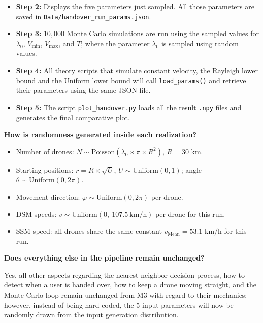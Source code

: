 \documentclass[11pt]{article}
\newcommand{\subquestion}[1]{
    \vspace{0.3cm}
    \noindent\textbf{#1}
    \vspace{0.1cm}
}
\begin{document}
\begin{enumerate}[label=\textbf{Scribe Question \arabic*:}, leftmargin=*, itemsep=1.5em]
\begin{itemize}[leftmargin=*, itemsep=0.3em]
    \item \textbf{Step 2:} Displays the five parameters just sampled. All those parameters are saved
          in \texttt{Data/handover\_run\_params.json}.

    \item \textbf{Step 3:} $10{,}000$ Monte Carlo simulations are run using the sampled values for
          $\lambda_0$, $V_{\min}$, $V_{\max}$, and $T$; where the parameter $\lambda_0$ is sampled
          using random values.

    \item \textbf{Step 4:} All theory scripts that simulate constant velocity, the Rayleigh lower bound
          and the Uniform lower bound will call \texttt{load\_params()} and retrieve their parameters
          using the same JSON file.

    \item \textbf{Step 5:} The script \texttt{plot\_handover.py} loads all the result \texttt{.npy}
          files and generates the final comparative plot.
\end{itemize}

\subquestion{How is randomness generated inside each realization?}

\begin{itemize}[leftmargin=*, itemsep=0.3em]
    \item Number of drones: $N \sim \text{Poisson}(\lambda_0 \times \pi \times R^2)$, $R = 30$ km.
    \item Starting positions: $r = R \times \sqrt{U}$, $U \sim \text{Uniform}(0,1)$;
          angle $\theta \sim \text{Uniform}(0, 2\pi)$.
    \item Movement direction: $\varphi \sim \text{Uniform}(0, 2\pi)$ per drone.
    \item DSM speeds: $v \sim \text{Uniform}(0,\ 107.5\ \text{km/h})$ per drone for this run.
    \item SSM speed: all drones share the same constant $v_{\text{Mean}} = 53.1$ km/h for this run.
\end{itemize}

\subquestion{Does everything else in the pipeline remain unchanged?}

Yes, all other aspects regarding the nearest-neighbor decision process, how to detect when a user is
handed over, how to keep a drone moving straight, and the Monte Carlo loop remain unchanged from
M3 with regard to their mechanics; however, instead of being hard-coded, the 5 input parameters
will now be randomly drawn from the input generation distribution.


\end{enumerate}
\end{document}

